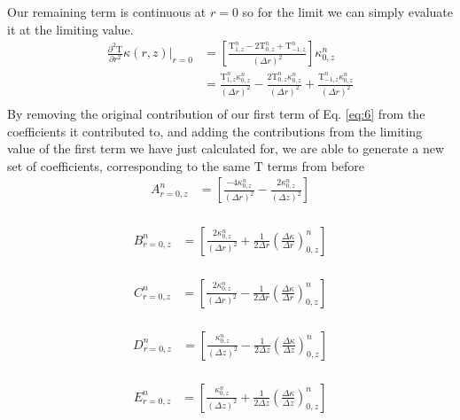 \documentclass[12pt]{article}
\begin{document}
      Our remaining term is continuous at $r=0$ so for the limit we can simply evaluate it at the limiting value.
      \begin{equation}
        \begin{aligned}
          \frac{\partial^2\mathrm{T}}{\partial r^2}\kappa(r, z)\rvert_{r=0} &= \left [\frac{\mathrm{T}^{n}_{1, z}  - 2 \mathrm{T}^{n}_{0, z} +  \mathrm{T}^{n}_{-1, z}}{(\Delta r)^2} \right ] \kappa^n_{0, z} \\
           &= \frac{\mathrm{T}^n_{1, z}\kappa^n_{0, z}}{(\Delta r)^2} - \frac{2 \mathrm{T}^n_{0, z}\kappa^n_{0,z}}{(\Delta r)^2} + \frac{\mathrm{T}^n_{- 1, z}\kappa^n_{0,z}}{(\Delta r)^2}\\
        \end{aligned}
      \end{equation}
    By removing the original contribution of our first term of Eq. \ref{eq:6} from the coefficients it contributed to, and adding the contributions from the limiting value of the first term we have just calculated for, we are able to generate a new set of coefficients, corresponding to the same $\mathrm{T}$ terms from before
		\begin{equation}
      \begin{aligned}
        A^n_{r=0, z} &= \left [\frac{-4\kappa^n_{0, z}}{(\Delta r)^2} -\frac{2\kappa^n_{0, z}}{(\Delta z)^2}  \right ] \\
      \end{aligned}
		\end{equation}
		
		\begin{equation}
      \begin{aligned}
        B^n_{r=0, z} &= \left [\frac{2\kappa^n_{0, z}}{(\Delta r)^2} + \frac{1}{2\Delta r}(\frac{\Delta\kappa}{\Delta r})^n_{0, z} \right ] \\
      \end{aligned}
		\end{equation}
		
		\begin{equation}
      \begin{aligned}
        C^n_{r=0, z} &= \left [\frac{2\kappa^n_{0, z}}{(\Delta r)^2} - \frac{1}{2\Delta r}(\frac{\Delta\kappa}{\Delta r})^n_{0, z} \right ] \\
      \end{aligned}
		\end{equation}

		\begin{equation}
      \begin{aligned}
        D^n_{r=0, z} &= \left [\frac{\kappa^n_{0, z}}{(\Delta z)^2} - \frac{1}{2\Delta z}(\frac{\Delta\kappa}{\Delta z})^n_{0, z}  \right ] \\
      \end{aligned}
		\end{equation}
		
		\begin{equation}
      \begin{aligned}
        E^n_{r=0, z} &= \left [ \frac{\kappa^n_{0, z}}{(\Delta z)^2} + \frac{1}{2\Delta z}(\frac{\Delta\kappa}{\Delta z})^n_{0, z} \right ] \\
      \end{aligned}
		\end{equation}
\end{document}

